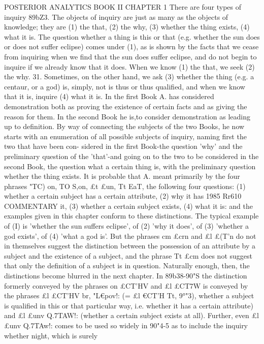 POSTERIOR ANALYTICS
BOOK II
CHAPTER 1
There are four types of inquiry
89bZ3. The objects of inquiry are just as many as the objects
of knowledge; they are (1) the that, (2) the why, (3) whether the
thing exists, (4) what it is. The question whether a thing is this
or that (e.g. whether the sun does or does not suffer eclipse)
comes under (1), as is shown by the facts that we cease from
inquiring when we find that the sun does suffer eclipse, and do not
begin to inquire if we already know that it does. When we know
(1) the that, we seek (2) the why.
31. Sometimes, on the other hand, we ask (3) whether the
thing (e.g. a centaur, or a god) is, simply, not is thus or thus
qualified, and when we know that it is, inquire (4) what it is.
In the first Book A. has considered demonstration both as
proving the existence of certain facts and as giving the reason
for them. In the second Book he is,to consider demonstration as
leading up to definition. By way of connecting the subjects of
the two Books, he now starts with an enumeration of all possible
subjects of inquiry, naming first the two that have been con-
sidered in the first Book-the question 'why' and the preliminary
question of the 'that'-and going on to the two to be considered
in the second Book, the question what a certain thing is, with the
preliminary question whether the thing exists.
It is probable that A. meant primarily by the four phrases "TC)
on, TO S,on, £t £un, Tt EaT, the following four questions: (1)
whether a certain subject has a certain attribute, (2) why it has
1985
Rr610
COMMENTARY
it, (3) whether a certain subject exists, (4) what it is: and the
examples given in this chapter conform to these distinctions.
The typical example of (I) is 'whether the sun suffers eclipse',
of (2) 'why it does', of (3) 'whether a god exists', of (4) 'what
a god is'. But the phrases cm £crn and £l £(T'n do not in themselves
suggest the distinction between the possession of an attribute by
a subject and the existence of a subject, and the phrase Tt £cm does
not suggest that only the definition of a subject is in question.
Naturally enough, then, the distinctions become blurred in the
next chapter. In 89b38-90"S the distinction formerly conveyed by
the phrases on £CT'HV and £l £CT7W is conveyed by the phrases £l
£CT'HV br, "L€pov!: (= £l €CT'H Tt, 9°"3), whether a subject is qualified
in this or that particular way, i.e. whether it has a certain
attribute) and £l £unv Q.7TAW!: (whether a certain subject exists at
all). Further, even £l £unv Q.7TAw!: comes to be used so widely in
90"4-5 as to include the inquiry whether night, which is surely
